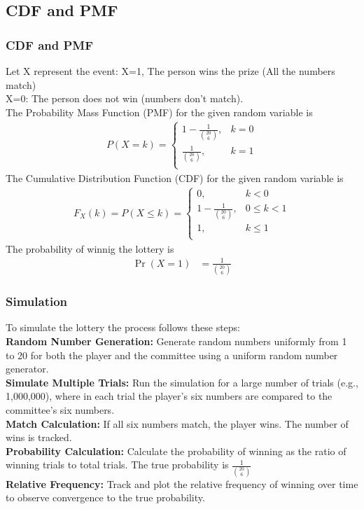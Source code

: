 \documentclass{beamer}
\providecommand{\brak}[1]{\ensuremath{\left(#1\right)}}
\theoremstyle{remark}
\numberwithin{equation}{section}
\begin{document}
\subsection{CDF and PMF}
\begin{frame}
    \frametitle{CDF and PMF}
Let X represent the event:\newline
X=1, The person wins the prize (All the numbers match)\\
X=0: The person does not win (numbers don't match).\\
The Probability Mass Function (PMF) for the given random variable is
\begin{align}
P(X = k) =
\begin{cases}
	1-\frac{1}{\binom{20}{6}}, & k = 0 \\
	\frac{1}{\binom{20}{6}}, & k = 1 \\
\end{cases}
\end{align}
The Cumulative Distribution Function (CDF) for the given random variable is
\begin{align}
F_X(k) = P(X \le k) = 
\begin{cases}
	0, & k < 0 \\
	1-\frac{1}{\binom{20}{6}}, & 0 \le k < 1 \\
	1, & k \le 1\\
\end{cases}
\end{align}
The probability of winnig the lottery is
\begin{align}
  \Pr\brak{X=1} &= \frac{1}{\binom{20}{6}}
\end{align}
\end{frame}
\begin{frame}
\frametitle{Simulation}
To simulate the lottery the process follows these steps:\\
\textbf{Random Number Generation:} Generate random numbers uniformly from 1 to 20 for both the player and the committee using a uniform random number generator.\\
\textbf{Simulate Multiple Trials:} Run the simulation for a large number of trials (e.g., 1,000,000), where in each trial the player's six numbers are compared to the committee's six numbers.\\
\textbf{Match Calculation:} If all six numbers match, the player wins. The number of wins is tracked.\\ \textbf{Probability Calculation:} Calculate the probability of winning as the ratio of winning trials to total trials. The true probability is \( \frac{1}{\binom{20}{6}} \)\\
\textbf{Relative Frequency:} Track and plot the relative frequency of winning over time to observe convergence to the true probability.
\end{frame}
\end{document}
